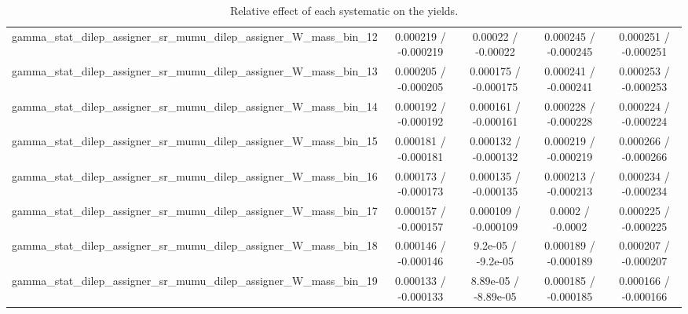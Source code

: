 \documentclass[10pt]{article}
\begin{document}
\begin{table}[htbp]
\begin{center}
\begin{tabular}{|c|c|c|c|c|}
  gamma_stat_dilep_assigner_sr_mumu_dilep_assigner_W_mass_bin_12 & 0.000219 / -0.000219 & 0.00022 / -0.00022 & 0.000245 / -0.000245 & 0.000251 / -0.000251 \\ 
  gamma_stat_dilep_assigner_sr_mumu_dilep_assigner_W_mass_bin_13 & 0.000205 / -0.000205 & 0.000175 / -0.000175 & 0.000241 / -0.000241 & 0.000253 / -0.000253 \\ 
  gamma_stat_dilep_assigner_sr_mumu_dilep_assigner_W_mass_bin_14 & 0.000192 / -0.000192 & 0.000161 / -0.000161 & 0.000228 / -0.000228 & 0.000224 / -0.000224 \\ 
  gamma_stat_dilep_assigner_sr_mumu_dilep_assigner_W_mass_bin_15 & 0.000181 / -0.000181 & 0.000132 / -0.000132 & 0.000219 / -0.000219 & 0.000266 / -0.000266 \\ 
  gamma_stat_dilep_assigner_sr_mumu_dilep_assigner_W_mass_bin_16 & 0.000173 / -0.000173 & 0.000135 / -0.000135 & 0.000213 / -0.000213 & 0.000234 / -0.000234 \\ 
  gamma_stat_dilep_assigner_sr_mumu_dilep_assigner_W_mass_bin_17 & 0.000157 / -0.000157 & 0.000109 / -0.000109 & 0.0002 / -0.0002 & 0.000225 / -0.000225 \\ 
  gamma_stat_dilep_assigner_sr_mumu_dilep_assigner_W_mass_bin_18 & 0.000146 / -0.000146 & 9.2e-05 / -9.2e-05 & 0.000189 / -0.000189 & 0.000207 / -0.000207 \\ 
  gamma_stat_dilep_assigner_sr_mumu_dilep_assigner_W_mass_bin_19 & 0.000133 / -0.000133 & 8.89e-05 / -8.89e-05 & 0.000185 / -0.000185 & 0.000166 / -0.000166 \\ 
\hline 
\end{tabular} 
\caption{Relative effect of each systematic on the yields.} 
\end{center} 
\end{table} 
\end{document}
